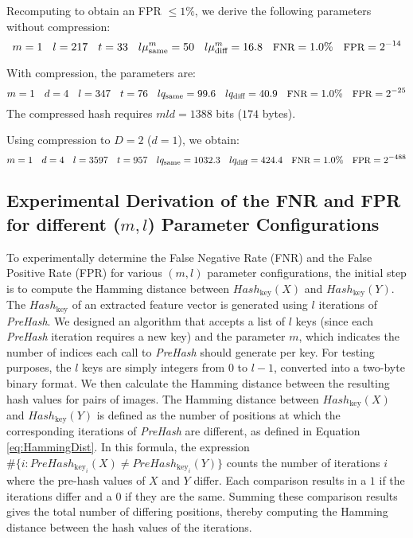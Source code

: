 Recomputing to obtain an FPR \(\leq 1\%\), we derive the following parameters without compression:
\begin{equation}
    \label{config:2}
\small
m = 1 \quad l = 217 \quad t = 33 \quad l\mu_{\text{same}}^m = 50 \quad l\mu_{\text{diff}}^m = 16.8 \quad \text{FNR} = 1.0\% \quad \text{FPR} = 2^{-14}
\end{equation}

With compression, the parameters are:
\begin{equation}
    \label{config:3}
\small
m = 1 \quad d = 4 \quad l = 347 \quad t = 76 \quad lq_{\text{same}} = 99.6 \quad lq_{\text{diff}} = 40.9 \quad \text{FNR} = 1.0\% \quad \text{FPR} = 2^{-25}
\end{equation}
The compressed hash requires \( mld = 1388 \) bits (\( 174 \) bytes).

Using compression to \( D = 2 \) (\( d = 1 \)), we obtain:
\begin{equation}
    \label{config:4}
\small
m = 1 \quad d = 4 \quad l = 3597 \quad t = 957 \quad lq_{\text{same}} = 1032.3 \quad lq_{\text{diff}} = 424.4 \quad \text{FNR} = 1.0\% \quad \text{FPR} = 2^{-488}
\end{equation}


\subsection{Experimental Derivation of the FNR and FPR for different (\(m, l\)) Parameter Configurations}

To experimentally determine the False Negative Rate (FNR) and the False Positive Rate (FPR) for various \((m, l)\) parameter configurations, the initial step is to compute the Hamming distance between \( Hash_{\text{key}}(X) \) and \( Hash_{\text{key}}(Y) \). The \( Hash_{\text{key}} \) of an extracted feature vector is generated using \( l \) iterations of \textit{PreHash}. We designed an algorithm that accepts a list of \( l \) keys (since each \textit{PreHash} iteration requires a new key) and the parameter \( m \), which indicates the number of indices each call to \textit{PreHash} should generate per key. For testing purposes, the \( l \) keys are simply integers from 0 to \( l-1 \), converted into a two-byte binary format. We then calculate the Hamming distance between the resulting hash values for pairs of images. The Hamming distance between \( Hash_{\text{key}}(X) \) and \( Hash_{\text{key}}(Y) \) is defined as the number of positions at which the corresponding iterations of \textit{PreHash} are different, as defined in Equation \ref{eq:HammingDist}. In this formula, the expression \( \# \{ i : PreHash_{\text{key}_i}(X) \neq PreHash_{\text{key}_i}(Y) \} \) counts the number of iterations \( i \) where the pre-hash values of \( X \) and \( Y \) differ. Each comparison results in a \(1\) if the iterations differ and a \(0\) if they are the same. Summing these comparison results gives the total number of differing positions, thereby computing the Hamming distance between the hash values of the iterations.


